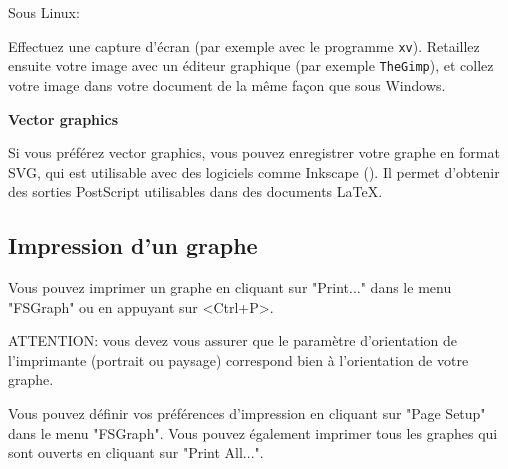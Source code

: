 \bigskip
\noindent Sous Linux:

\bigskip
\noindent Effectuez une capture d’écran (par exemple avec le programme \verb+xv+). Retaillez ensuite
votre image avec un éditeur graphique (par exemple \verb+TheGimp+), et collez votre image dans
votre document de la même façon que sous Windows.


\newpage
\bigskip
\noindent\textbf{Vector graphics}

\bigskip
\noindent Si vous préférez vector graphics, vous pouvez enregistrer votre graphe en format
SVG, qui est utilisable avec des logiciels comme  Inkscape (\cite{Inkscape}).
Il permet d'obtenir des sorties PostScript utilisables dans des documents \LaTeX.

\subsection{Impression d’un graphe}

Vous pouvez imprimer un graphe en cliquant sur "Print..." dans le menu "FSGraph" ou
en appuyant sur <Ctrl+P>.


\bigskip
\noindent ATTENTION: vous devez vous assurer que le paramètre d’orientation de l’imprimante
(portrait ou paysage) correspond bien à l’orientation de votre graphe.


\bigskip
\noindent Vous pouvez définir vos préférences d’impression en cliquant sur "Page Setup" dans le
menu "FSGraph". Vous pouvez également imprimer tous les graphes qui sont ouverts en
cliquant sur "Print All...".



